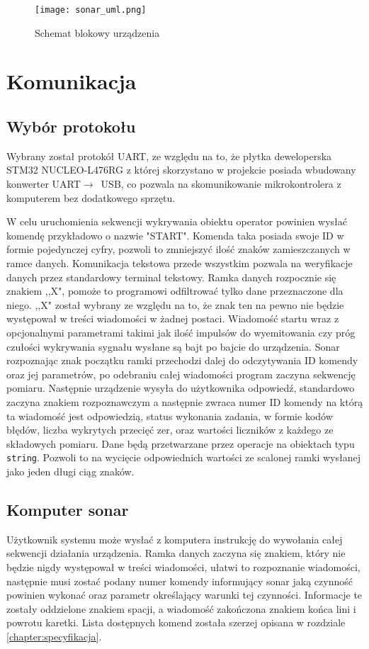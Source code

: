 \begin{figure}[ht!]
    \centering
    \texttt{[image: sonar\_uml.png]}
    \caption{Schemat blokowy urządzenia}
    \label{fig:uml}
\end{figure}

\section{Komunikacja}

\subsection{Wybór protokołu}

Wybrany został protokół UART, ze względu na to, że płytka deweloperska STM32 NUCLEO-L476RG 
z której skorzystano w projekcie posiada wbudowany konwerter UART$\rightarrow$~USB, 
co pozwala na skomunikowanie mikrokontrolera z komputerem bez dodatkowego sprzętu.

W celu uruchomienia sekwencji wykrywania obiektu operator powinien wysłać komendę przykładowo o nazwie "START". 
Komenda taka posiada swoje ID w formie pojedynczej cyfry, pozwoli to zmniejszyć ilość znaków zamieszczanych w ramce danych. 
Komunikacja tekstowa przede wszystkim pozwala na weryfikacje danych przez standardowy terminal tekstowy. 
Ramka danych rozpocznie się znakiem ,,X", pomoże to programowi odfiltrować tylko dane przeznaczone dla niego. ,,X" został wybrany ze względu na to, 
że znak ten na pewno nie będzie występował w treści wiadomości w żadnej postaci.
Wiadomość startu wraz z opcjonalnymi parametrami takimi jak ilość impulsów do wyemitowania czy próg czułości wykrywania sygnału wysłane są bajt po bajcie do urządzenia. 
Sonar rozpoznając znak początku ramki przechodzi dalej do odczytywania ID komendy oraz jej parametrów, po odebraniu całej wiadomości program zaczyna sekwencję pomiaru.
Następnie urządzenie wysyła do użytkownika odpowiedź, standardowo zaczyna znakiem rozpoznawczym a następnie zwraca numer ID komendy na którą ta wiadomość jest odpowiedzią,
status wykonania zadania, w formie kodów błędów, liczba wykrytych przecięć zer, oraz wartości liczników z każdego ze składowych pomiaru.
Dane będą przetwarzane przez operacje na obiektach typu {\tt string}. Pozwoli to na wycięcie odpowiednich wartości ze scalonej ramki wysłanej jako jeden długi ciąg znaków.

\subsection{Komputer \textrightarrow{} sonar}
Użytkownik systemu może wysłać z komputera instrukcję do wywołania całej sekwencji działania urządzenia. 
Ramka danych zaczyna się znakiem, który nie będzie nigdy występował w treści wiadomości, ułatwi to rozpoznanie wiadomości, 
następnie musi zostać podany numer komendy informujący sonar jaką czynność powinien wykonać oraz 
parametr określający warunki tej czynności. Informacje te zostały oddzielone znakiem spacji, a wiadomość zakończona znakiem końca lini i powrotu karetki.
Lista dostępnych komend została szerzej opisana w rozdziale \ref{chapter:specyfikacja}. 

